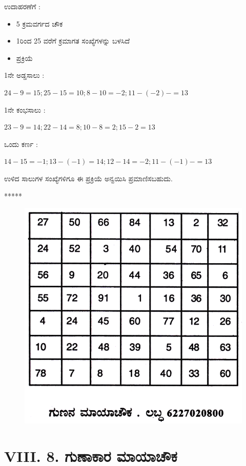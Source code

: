 ಉದಾಹರಣೆಗೆ :
\begin{itemize}
	\item 5 ಕ್ರಮವರ್ಗದ ಚೌಕ
	\item 1ರಿಂದ 25 ವರೆಗೆ ಕ್ರಮಾಗತ ಸಂಖ್ಯೆಗಳನ್ನು ಬಳಸಿದೆ
	\item ಪ್ರಕ್ರಿಯೆ
\end{itemize}

1ನೇ ಅಡ್ಡಸಾಲು :

$24-9=15; 25-15=10; 8-10=-2; 11-(-2)-= \boxed{13}$

1ನೇ ಕಂಭಸಾಲು :

$23-9=14; 22-14=8; 10-8=2; 15-2= \boxed{13}$

ಒಂದು ಕರ್ಣ :

$14-15=-1; 13-(-1)=14; 12-14=-2; 11-(-1)-= \boxed{13}$

ಉಳಿದ ಸಾಲುಗಳ ಸಂಖ್ಯೆಗಳಿಗೂ ಈ ಪ್ರಕ್ರಿಯೆ ಅನ್ವಯಿಸಿ ಪ್ರಮಾಣಿಸಬಹುದು.
\begin{center}
*****
\end{center}
\begin{figure}[H]
\includegraphics{src/figures/chap7/fig7.25.jpg}
\end{figure}

\section*{VIII. 8. ಗುಣಾಕಾರ ಮಾಯಾಚೌಕ}

